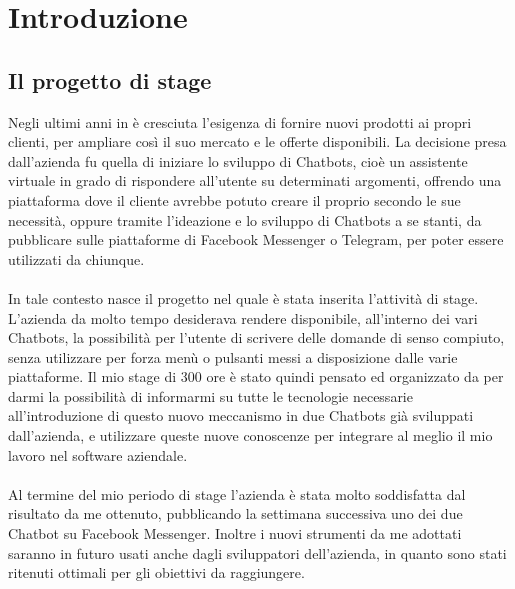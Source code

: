
\chapter{Introduzione}
\label{cap:contesto-aziendale}
\section{Il progetto di stage}
Negli ultimi anni in \azienda{} è cresciuta l'esigenza di fornire nuovi prodotti ai propri clienti, per ampliare così il suo mercato e le offerte disponibili. La decisione presa dall'azienda fu quella di iniziare lo sviluppo di \glspl{Chatbot}, cioè un assistente virtuale in grado di rispondere all'utente su determinati argomenti, offrendo una piattaforma dove il cliente avrebbe potuto creare il proprio secondo le sue necessità, oppure tramite l'ideazione e lo sviluppo di \glspl{Chatbot} a se stanti, da pubblicare sulle piattaforme di Facebook Messenger o Telegram, per poter essere utilizzati da chiunque.\\ \\
In tale contesto nasce il progetto nel quale è stata inserita l'attività di stage. L'azienda da molto tempo desiderava rendere disponibile, all'interno dei vari \glspl{Chatbot}, la possibilità per l'utente di scrivere delle domande di senso compiuto, senza utilizzare per forza menù o pulsanti messi a disposizione dalle varie piattaforme. Il mio stage di 300 ore è stato quindi pensato ed organizzato da \azienda{} per darmi la possibilità di informarmi su tutte le tecnologie necessarie all'introduzione di questo nuovo meccanismo in due \glspl{Chatbot} già sviluppati dall'azienda, e utilizzare queste nuove conoscenze per integrare al meglio il mio lavoro nel software aziendale.  \\ \\
Al termine del mio periodo di stage l'azienda è stata molto soddisfatta dal risultato da me ottenuto, pubblicando la settimana successiva uno dei due \gls{Chatbot} su Facebook Messenger. Inoltre i nuovi strumenti da me adottati saranno in futuro usati anche dagli sviluppatori dell'azienda, in quanto sono stati ritenuti ottimali per gli obiettivi da raggiungere.


\newpage
